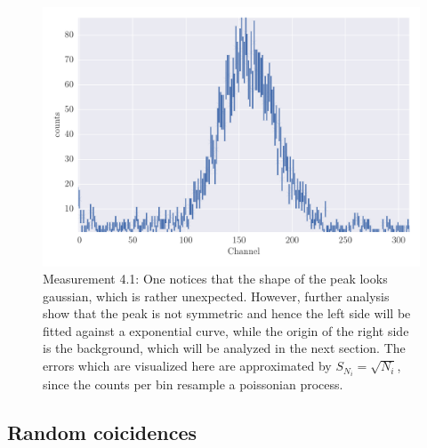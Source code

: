 \begin{figure}[htpb]
    \centering
    \includegraphics[width=1.0\linewidth]{analysis/figures/plot4_1}
    \caption{Measurement 4.1: One notices that the shape
        of the peak looks gaussian, which is rather unexpected. However,
        further analysis show that the peak is not symmetric and hence the left 
        side will be fitted against a exponential curve, while the origin of the
        right side is the background, which will be analyzed in the next section.
        The errors which are visualized here are approximated by $S_{N_i} = \sqrt{N_i}$, since
        the counts per bin resample a poissonian process.}
    \label{fig:4_1}
\end{figure}
\clearpage
\subsection{Random coicidences}
\label{ssub:Random coicidences}
